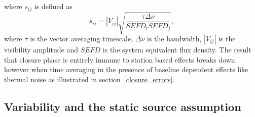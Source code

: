 \noindent where $s_{ij}$ is defined as
\begin{equation}
s_{ij}=|V_{ij}| \sqrt{\frac{ \tau \Delta \nu}{SEFD_i SEFD_j}},
\end{equation}
where $\tau$ is the vector averaging timescale, $\Delta \nu$ is the bandwidth, $|V_{ij}|$ is the visibility amplitude and $SEFD$ is the system equivalent flux density. The result that closure phase is entirely immune to station based effects breaks down however when time averaging in the presence of baseline dependent effects like thermal noise as illustrated in section~\ref{closure_errors}.
 
\subsection{Variability and the static source assumption}

